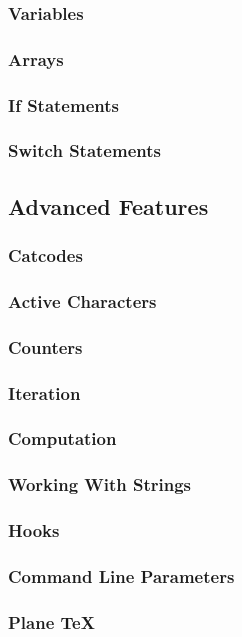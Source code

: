 \subsubsection{Variables}
\subsubsection{Arrays}
\subsubsection{If Statements}
\subsubsection{Switch Statements}


\subsection{Advanced Features}
\subsubsection{Catcodes}
\subsubsection{Active Characters}
\subsubsection{Counters}
\subsubsection{Iteration}
\subsubsection{Computation}
\subsubsection{Working With Strings}
\subsubsection{Hooks}
\subsubsection{Command Line Parameters}
\subsubsection{Plane \TeX}


